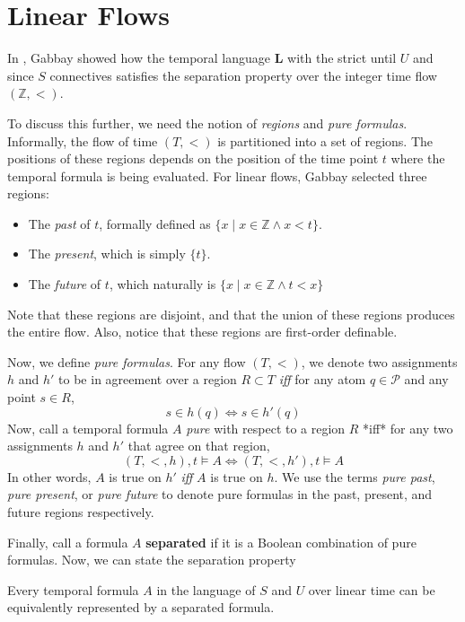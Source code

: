 \documentclass[a4paper,UKenglish,cleveref, autoref, thm-restate]{lipics-v2021}
\begin{document}
\section{Linear Flows}

In \cite{gabbay1994}, Gabbay showed how the temporal language $\mathbf{L}$ with the strict until $U$ and since $S$ connectives satisfies the separation property over the integer time flow $(\mathbb{Z}, <)$.

To discuss this further, we need the notion of \textit{regions} and \textit{pure formulas}. Informally, the flow of time $(T, <)$ is partitioned into a set of regions. The positions of these regions depends on the position of the time point $t$ where the temporal formula is being evaluated. For linear flows, Gabbay selected three regions:

\begin{itemize}
    \item The \textit{past} of $t$, formally defined as $\{ x \mid x \in \mathbb{Z} \land x < t\}$.
    \item The \textit{present}, which is simply $\{ t \}$.
    \item The \textit{future} of $t$, which naturally is $\{x \mid x \in \mathbb{Z} \land t < x\}$
\end{itemize}

Note that these regions are disjoint, and that the union of these regions produces the entire flow. Also, notice that these regions are first-order definable.

Now, we define \textit{pure formulas}. For any flow $(T, <)$, we denote two assignments $h$ and $h'$ to be in agreement over a region $R \subset T$ \textit{iff} for any atom $q \in \mathcal{P}$ and any point $s \in R$,
\begin{equation*}
    s \in h(q) \Longleftrightarrow s \in h'(q)
\end{equation*}
Now, call a temporal formula $A$ \textit{pure} with respect to a region $R$ *iff* for any two assignments $h$ and $h'$ that agree on that region,
\begin{equation*}
    (T, <, h), t \vDash A \Longleftrightarrow (T, <, h'), t \vDash A
\end{equation*}
In other words, $A$ is true on $h'$ \textit{iff} $A$ is true on $h$. We use the terms \textit{pure past}, \textit{pure present}, or \textit{pure future} to denote pure formulas in the past, present, and future regions respectively.

Finally, call a formula $A$ \textbf{separated} if it is a Boolean combination of pure formulas. Now, we can state the separation property
\begin{theorem}
    \label{separation-theorem-linear-time}
    Every temporal formula $A$ in the language of $S$ and $U$ over linear time can be equivalently represented by a separated formula.
\end{theorem}
\end{document}
